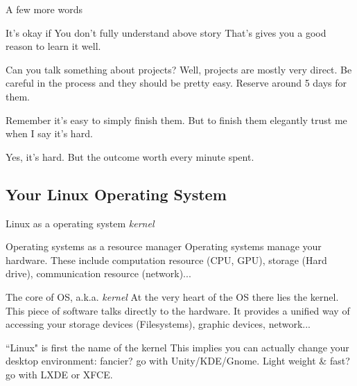 \begin{frame}{A few more words}
\begin{block}{It's okay if You don't fully understand above story}
	That's gives you a good reason to learn it well.
\end{block}
\begin{block}{Can you talk something about projects?}
	Well, projects are mostly very direct. Be careful in the process and they should be pretty easy. Reserve around 5 days for them.
	
	Remember it's easy to simply finish them. But to finish them elegantly trust me when I say it's hard. 
	
	Yes, it's hard. But the outcome worth every minute spent.
\end{block}
\end{frame}

\subsection{Your Linux Operating System}
\begin{frame}{Linux as a operating system \textit{kernel}}
\begin{block}{Operating systems as a resource manager}
	Operating systems manage your hardware. These include computation resource (CPU, GPU), storage (Hard drive), communication resource (network)...
\end{block}
\begin{block}{The core of OS, a.k.a. \textit{kernel}}
	At the very heart of the OS there lies the kernel. This piece of software talks directly to the hardware. It provides a unified way of accessing your storage devices (Filesystems), graphic devices, network...
\end{block}
\begin{block}{``Linux" is first the name of the kernel}
	This implies you can actually change your desktop environment: fancier? go with Unity/KDE/Gnome. Light weight \& fast? go with LXDE or XFCE. 
\end{block}
\end{frame}

